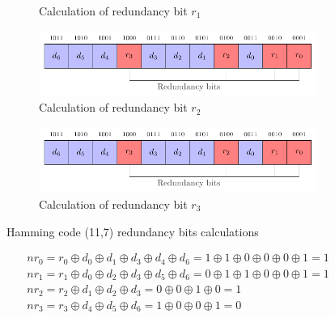 \begin{figure}[ht]
\begin{subfigure}[b]{0.49\textwidth}
        \caption{Calculation of redundancy bit $r_1$}
        \label{fig:hamming_code_example_3}
    \end{subfigure}
    \hfill
    \begin{subfigure}[b]{0.49\textwidth}
        \includegraphics[width=\textwidth, page=8]{c5_countermeasures_dift/img/hamming_bit.pdf}
        \caption{Calculation of redundancy bit $r_2$}
        \label{fig:hamming_code_example_4}
    \end{subfigure}
    \hfill
    \begin{subfigure}[b]{0.49\textwidth}
        \includegraphics[width=\textwidth, page=10]{c5_countermeasures_dift/img/hamming_bit.pdf}
        \caption{Calculation of redundancy bit $r_3$}
        \label{fig:hamming_code_example_5}
    \end{subfigure}
    \caption{Hamming code (11,7) redundancy bits calculations}
    \label{fig:hamming_code_example}
\end{figure}

\begin{equation} \label{equat:hamming_decoder}
    \begin{split}
        nr_{0} = r_{0} \oplus d_{0} \oplus d_{1} \oplus d_{3} \oplus d_{4} \oplus d_{6} = 1 \oplus 1 \oplus 0 \oplus 0 \oplus 0 \oplus 1    = 1 \\
        nr_{1} = r_{1} \oplus d_{0} \oplus d_{2} \oplus d_{3} \oplus d_{5} \oplus d_{6} = 0 \oplus 1 \oplus 1 \oplus 0 \oplus 0 \oplus 1    = 1 \\
        nr_{2} = r_{2} \oplus d_{1} \oplus d_{2} \oplus d_{3}                           = 0 \oplus 0 \oplus 1 \oplus 0                      = 1 \\
        nr_{3} = r_{3} \oplus d_{4} \oplus d_{5} \oplus d_{6}                           = 1 \oplus 0 \oplus 0 \oplus 1                      = 0
    \end{split}
\end{equation}

